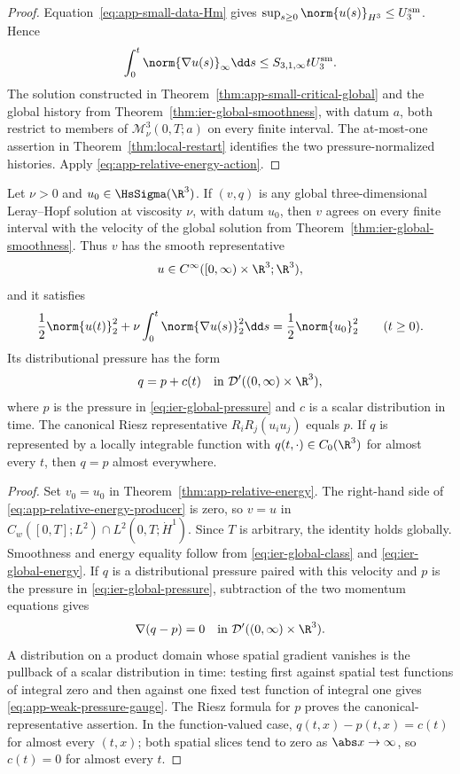 \begin{proof}
Equation~\eqref{eq:app-small-data-Hm} gives
\(\sup_{s\ge0}\norm{u(s)}_{H^3}\le U_3^{\rm sm}\).  Hence
\[
 \int_0^t\norm{\nabla u(s)}_\infty\dd s
 \le S_{3,1,\infty}tU_3^{\rm sm}.
\]
The solution constructed in Theorem~\ref{thm:app-small-critical-global} and
the global history from Theorem~\ref{thm:ier-global-smoothness}, with datum
\(a\), both restrict to members of
\(\mathscr M_\nu^3(0,T;a)\) on every finite interval.  The at-most-one
assertion in Theorem~\ref{thm:local-restart} identifies the two
pressure-normalized histories.
Apply \eqref{eq:app-relative-energy-action}.
\end{proof}

\begin{corollary}
\label{cor:app-leray-uniqueness}
Let \(\nu>0\) and \(u_0\in\HsSigma(\R^3)\).  If \((v,q)\) is any global
three-dimensional Leray--Hopf solution at viscosity \(\nu\), with datum
\(u_0\), then \(v\) agrees on every finite interval with the velocity of the
global solution from Theorem~\ref{thm:ier-global-smoothness}.  Thus \(v\) has
the smooth
representative
\[
 u\in C^\infty([0,\infty)\times\R^3;\R^3),
\]
and it satisfies
\[
 \frac12\norm{u(t)}_2^2
 +\nu\int_0^t\norm{\nabla u(s)}_2^2\dd s
 =\frac12\norm{u_0}_2^2
 \qquad(t\ge0).
\]
Its distributional pressure has the form
\begin{equation}
 q=p+c(t)
 \quad\text{in }\mathcal D'((0,\infty)\times\R^3),
 \label{eq:app-weak-pressure-gauge}
\end{equation}
where \(p\) is the pressure in \eqref{eq:ier-global-pressure} and \(c\) is a
scalar distribution in time.  The canonical Riesz representative
\(R_iR_j(u_i u_j)\) equals \(p\).  If \(q\) is represented by a locally
integrable function with \(q(t,\cdot)\in C_0(\R^3)\) for almost every \(t\),
then \(q=p\) almost everywhere.
\end{corollary}

\begin{proof}
Set \(v_0=u_0\) in Theorem~\ref{thm:app-relative-energy}.  The right-hand
side of \eqref{eq:app-relative-energy-producer} is zero, so
\(v=u\) in \(C_w([0,T];L^2)\cap L^2(0,T;\dot H^1)\).  Since \(T\) is
 arbitrary, the identity holds globally.  Smoothness and energy equality
 follow from \eqref{eq:ier-global-class} and
 \eqref{eq:ier-global-energy}.  If \(q\) is a distributional pressure paired
 with this velocity and \(p\) is the pressure in
 \eqref{eq:ier-global-pressure}, subtraction of the two momentum equations
 gives
 \[
  \nabla(q-p)=0
  \quad\text{in }\mathcal D'((0,\infty)\times\R^3).
 \]
 A distribution on a product domain whose spatial gradient vanishes is the
 pullback of a scalar distribution in time: testing first against spatial test
 functions of integral zero and then against one fixed test function of
 integral one gives \eqref{eq:app-weak-pressure-gauge}.  The Riesz formula for
 \(p\) proves the canonical-representative assertion.  In the function-valued
 case, \(q(t,x)-p(t,x)=c(t)\) for almost every \((t,x)\); both spatial slices
 tend to zero as \(\abs x\to\infty\), so \(c(t)=0\) for almost every \(t\).
\end{proof}

